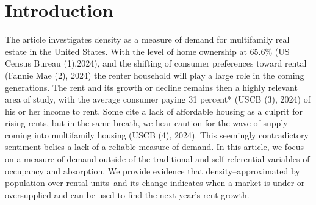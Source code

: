 \documentclass[sn-mathphys-num]{sn-jnl}%
\theoremstyle{thmstyleone}%
\theoremstyle{thmstyletwo}%
\theoremstyle{thmstylethree}%
\begin{document}
\section{Introduction}\label{sec1}

   

The article investigates density as a measure of demand for multifamily real estate in the United States. With the level of home ownership at 65.6\% (US Census Bureau (1),2024), and the shifting of consumer preferences toward rental (Fannie Mae (2), 2024) the renter household will play a large role in the coming generations. The rent and its growth or decline remains then a highly relevant area of study, with the average consumer paying 31 percent* (USCB (3), 2024) of his or her income to rent. Some cite a lack of affordable housing as a culprit for rising rents, but in the same breath, we hear caution for the wave of supply coming into multifamily housing (USCB (4), 2024). This seemingly contradictory sentiment belies a lack of a reliable measure of demand. In this article, we focus on a measure of demand outside of the traditional and self-referential variables of occupancy and absorption. We provide evidence that density--approximated by population over rental units--and its change indicates when a market is under or oversupplied and can be used to find the next year's rent growth.  

   
\end{document}
